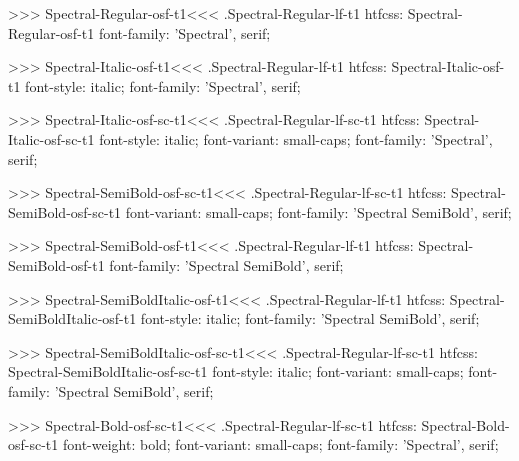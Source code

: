 >>>
\<Spectral-Regular-osf-t1\><<<
.Spectral-Regular-lf-t1
htfcss:  Spectral-Regular-osf-t1  font-family: 'Spectral', serif;

>>>
\<Spectral-Italic-osf-t1\><<<
.Spectral-Regular-lf-t1
htfcss:  Spectral-Italic-osf-t1  font-style: italic; font-family: 'Spectral', serif;

>>>
\<Spectral-Italic-osf-sc-t1\><<<
.Spectral-Regular-lf-sc-t1
htfcss:  Spectral-Italic-osf-sc-t1  font-style: italic; font-variant: small-caps; font-family: 'Spectral', serif;

>>>
\<Spectral-SemiBold-osf-sc-t1\><<<
.Spectral-Regular-lf-sc-t1
htfcss:  Spectral-SemiBold-osf-sc-t1  font-variant: small-caps; font-family: 'Spectral SemiBold', serif;

>>>
\<Spectral-SemiBold-osf-t1\><<<
.Spectral-Regular-lf-t1
htfcss:  Spectral-SemiBold-osf-t1  font-family: 'Spectral SemiBold', serif;

>>>
\<Spectral-SemiBoldItalic-osf-t1\><<<
.Spectral-Regular-lf-t1
htfcss:  Spectral-SemiBoldItalic-osf-t1  font-style: italic; font-family: 'Spectral SemiBold', serif;

>>>
\<Spectral-SemiBoldItalic-osf-sc-t1\><<<
.Spectral-Regular-lf-sc-t1
htfcss:  Spectral-SemiBoldItalic-osf-sc-t1  font-style: italic; font-variant: small-caps; font-family: 'Spectral SemiBold', serif;

>>>
\<Spectral-Bold-osf-sc-t1\><<<
.Spectral-Regular-lf-sc-t1
htfcss:  Spectral-Bold-osf-sc-t1  font-weight: bold; font-variant: small-caps; font-family: 'Spectral', serif;


